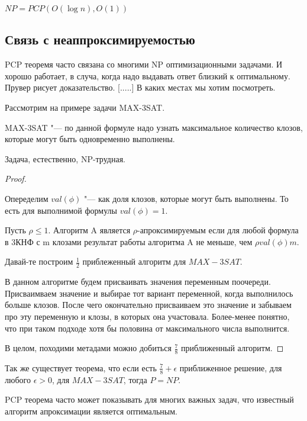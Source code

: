 \begin{theorem}
	$NP = PCP(O(\log n), O(1))$ 
\end{theorem} 

\subsection{Связь с неаппроксимируемостью}
PCP теоремя часто связана со многими NP оптимизационными задачами. 
И хорошо работает, в случа, когда надо выдавать ответ близкий к оптимальному. 
Прувер рисует доказательство. [.....] 
В каких местах мы хотим посмотреть. 

Рассмотрим на примере задачи MAX-3SAT. 
\begin{Def}
	MAX-3SAT "--- по данной формуле надо узнать максимальное 
	количество клозов, которые могут быть одновременно выполнены.
\end{Def}

Задача, естественно, NP-трудная.
\begin{proof}
	\begin{Def}
		Опеределим $val(\phi)$ "--- как доля клозов, которые 
		могут быть выполнены. То есть для выполнимой формулы $val(\phi) = 1$.
	\end{Def}
	\begin{Def}
	        Пусть $\rho \le 1$. Алгоритм A является $\rho$-апроксимируемым 
	        если для любой формула в 3КНФ с m клозами результат работы алгоритма A
	        не меньше, чем $\rho val(\phi)m$.
	\end{Def}

	Давай-те построим $\frac{1}{2}$ приблеженный алгоритм для $MAX-3SAT$.

	В данном алгоритме будем присваивать значения переменным поочереди. 
	Присваимваем значение и выбирае тот вариант переменной, когда выполнилось 
	больше клозов. После чего окончательно присваиваем это значение и забываем про 
	эту переменную и клозы, в которых она участовала. Более-менее понятно, 
	что при таком подходе хотя бы половина от максимального числа выполнится. 

	В целом, походими метадами можно добиться $\frac{7}{8}$ приближенный 
	алгоритм. 
\end{proof} 

Так же существует теорема, что если есть $\frac{7}{8} + \epsilon$ приближенное
решение, для любого $\epsilon > 0$, для $MAX-3SAT$, тогда $P = NP$.

PCP теорема часто может показывать для многих важных задач, что известный
алгоритм апроксимации является оптимальным.   

